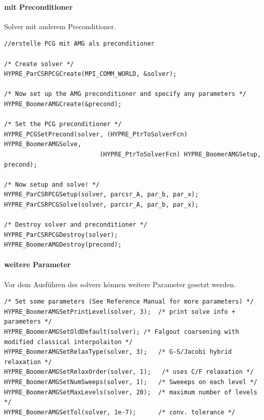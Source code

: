 \documentclass[a4paper,10pt]{article}
\numberwithin{figure}{section}
\numberwithin{table}{section}
\begin{document}
\paragraph{mit Preconditioner}

Solver mit anderem Preconditioner.

\begin{lstlisting}[frame=single,caption=HYPRE Nutzung: Solver mit Preconditioner, breaklines=true]
//erstelle PCG mit AMG als preconditioner

/* Create solver */
HYPRE_ParCSRPCGCreate(MPI_COMM_WORLD, &solver);

/* Now set up the AMG preconditioner and specify any parameters */
HYPRE_BoomerAMGCreate(&precond);

/* Set the PCG preconditioner */
HYPRE_PCGSetPrecond(solver, (HYPRE_PtrToSolverFcn) HYPRE_BoomerAMGSolve,
                          (HYPRE_PtrToSolverFcn) HYPRE_BoomerAMGSetup, precond);

/* Now setup and solve! */
HYPRE_ParCSRPCGSetup(solver, parcsr_A, par_b, par_x);
HYPRE_ParCSRPCGSolve(solver, parcsr_A, par_b, par_x);

/* Destroy solver and preconditioner */
HYPRE_ParCSRPCGDestroy(solver);
HYPRE_BoomerAMGDestroy(precond);

\end{lstlisting}

\paragraph{weitere Parameter}

Vor dem Ausführen des solvers können weitere Parameter gesetzt werden.

\begin{lstlisting}[frame=single,caption=HYPRE Nutzung: Solver mit Preconditioner, breaklines=true]
/* Set some parameters (See Reference Manual for more parameters) */
HYPRE_BoomerAMGSetPrintLevel(solver, 3);  /* print solve info + parameters */
HYPRE_BoomerAMGSetOldDefault(solver); /* Falgout coarsening with modified classical interpolaiton */
HYPRE_BoomerAMGSetRelaxType(solver, 3);   /* G-S/Jacobi hybrid relaxation */
HYPRE_BoomerAMGSetRelaxOrder(solver, 1);   /* uses C/F relaxation */
HYPRE_BoomerAMGSetNumSweeps(solver, 1);   /* Sweeeps on each level */
HYPRE_BoomerAMGSetMaxLevels(solver, 20);  /* maximum number of levels */
HYPRE_BoomerAMGSetTol(solver, 1e-7);      /* conv. tolerance */
\end{lstlisting}
\end{document}
